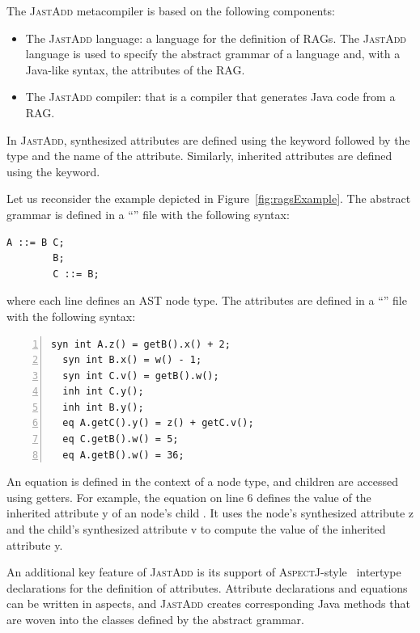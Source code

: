 The \textsc{JastAdd} metacompiler is based on the following components:
\begin{itemize}
    \item The \textsc{JastAdd} language: a language for the definition of RAGs.
    The \textsc{JastAdd} language is used to specify the abstract grammar of a language and,
    with a Java-like syntax, the attributes of the RAG.
    \item The \textsc{JastAdd} compiler: that is a compiler that generates Java code from a RAG.
\end{itemize}
In \textsc{JastAdd}, synthesized attributes are defined using the  keyword followed
by the type and the name of the attribute. Similarly, inherited attributes are defined
using the  keyword.

Let us reconsider the example depicted in Figure~\ref{fig:ragsExample}.
The abstract grammar is defined in a ``'' file with the following syntax:
    \begin{lstlisting}[language=JastAdd]
        A ::= B C;
        B;
        C ::= B;
    \end{lstlisting}
where each line defines an AST node type.
The attributes are defined in a ``'' file with the following syntax:
    \begin{lstlisting}[language=JastAdd, numbers=left,]
  syn int A.z() = getB().x() + 2;
  syn int B.x() = w() - 1;
  syn int C.v() = getB().w();
  inh int C.y();
  inh int B.y();
  eq A.getC().y() = z() + getC.v();
  eq C.getB().w() = 5;
  eq A.getB().w() = 36;
    \end{lstlisting}
An equation is defined in the context of a node type, and children are accessed using getters.
For example, the equation on line 6 defines the value of the
inherited attribute \textcolor{ATGsym}{y} of an  node's child .
It uses the  node's synthesized attribute \textcolor{ATGsym}{z} and the  child's
synthesized attribute \textcolor{ATGsym}{v} to compute the value of the inherited attribute \textcolor{ATGsym}{y}.


An additional key feature of \textsc{JastAdd} is its support of \textsc{AspectJ}-style~\cite{Kiczales1997Aspect} intertype
declarations for the definition of attributes.
Attribute declarations and equations can be written in aspects, and \textsc{JastAdd}
creates corresponding Java methods that are woven into the classes defined by the abstract grammar.

